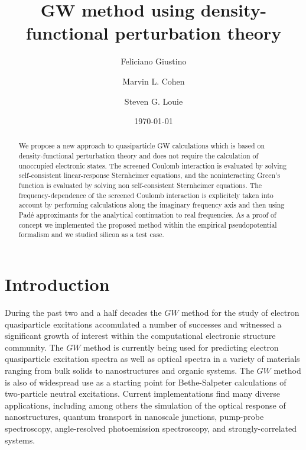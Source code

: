 \documentclass[twocolumn,prb,showpacs,superscriptaddress]{revtex4}
\begin{document}
\title{GW method using density-functional perturbation theory}

\author{Feliciano Giustino}
\author{Marvin L. Cohen}
\author{Steven G. Louie}
\date{\today}

\begin{abstract}
We propose a new approach to quasiparticle GW calculations which 
is based on density-functional perturbation theory and
does not require the calculation of unoccupied electronic states. The screened Coulomb interaction
is evaluated by solving self-consistent linear-response Sternheimer equations,
and the noninteracting Green's function is evaluated by solving non self-consistent
Sternheimer equations. The frequency-dependence of the screened Coulomb interaction 
is explicitely taken into account by performing calculations along the imaginary
frequency axis and then using Pad\'e approximants for the analytical continuation
to real frequencies. As a proof of concept we implemented the proposed method 
within the empirical pseudopotential formalism and we studied silicon as a test case. 
\end{abstract}


\maketitle

\section{Introduction}

During the past two and a half decades the $GW$ method\cite{hedin1,hl86}
for the study of electron quasiparticle excitations
accomulated a number of successes and witnessed a significant growth of interest
within the computational electronic structure community.
The $GW$ method is currently being used for predicting electron quasiparticle
excitation spectra as well as optical spectra in a variety of materials
ranging from bulk solids to nanostructures and organic systems. The
$GW$ method is also of widespread use as a starting point for Bethe-Salpeter calculations
of two-particle neutral excitations.\cite{onida,rolfing,reining-review}
Current implementations find many diverse applications,
including among others the simulation of the optical response of nanostructures,\cite{catalin} quantum transport in nanoscale
junctions,\cite{rubio} pump-probe spectroscopy,\cite{catalin-lw} angle-resolved photoemission
spectroscopy,\cite{cheolhwan} and strongly-correlated systems.\cite{bruneval-oxide}
\end{document}
